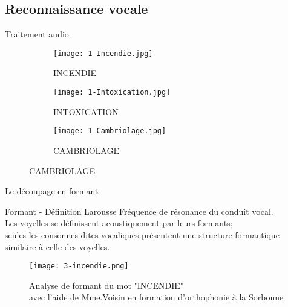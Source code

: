 \subsection{Reconnaissance vocale}

\begin{frame}{Traitement audio}
	\begin{figure}
		\begin{subfigure}[]{0.32\textwidth}
			\texttt{[image: 1-Incendie.jpg]}
			\caption{INCENDIE}
		\end{subfigure}
		\begin{subfigure}[]{0.32\textwidth}
			\texttt{[image: 1-Intoxication.jpg]}
			\caption{INTOXICATION}
		\end{subfigure}
		\begin{subfigure}[]{0.32\textwidth}
			\texttt{[image: 1-Cambriolage.jpg]}
			\caption{CAMBRIOLAGE}
		\end{subfigure}
	\end{figure}
\end{frame}



\begin{frame}{Le découpage en formant}
	\begin{block}{Formant - Définition Larousse}
		Fréquence de résonance du conduit vocal. \\
		Les voyelles se définissent acoustiquement par leurs formants; \\
		seules les consonnes dites vocaliques présentent une structure formantique similaire à celle des voyelles.
	\end{block}
	\begin{figure}
		\begin{center}
			\centering
			\texttt{[image: 3-incendie.png]}
			\caption{Analyse de formant du mot "INCENDIE" \\avec l'aide de Mme.Voisin en formation d'orthophonie à la Sorbonne}
		\end{center}
	\end{figure}
\end{frame}
